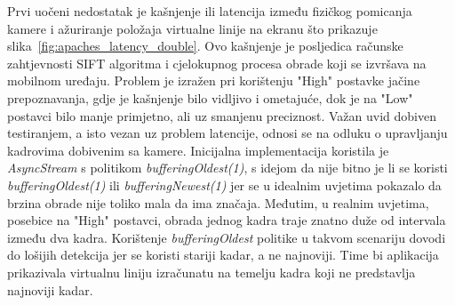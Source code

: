 Prvi uočeni nedostatak je kašnjenje ili latencija između fizičkog pomicanja kamere i ažuriranje položaja virtualne linije na ekranu što prikazuje slika~\ref{fig:apaches_latency_double}. Ovo kašnjenje je posljedica računske zahtjevnosti SIFT algoritma i cjelokupnog procesa obrade koji se izvršava na mobilnom uređaju. Problem je izražen pri korištenju "High" postavke jačine prepoznavanja, gdje je kašnjenje bilo vidljivo i ometajuće, dok je na "Low" postavci bilo manje primjetno, ali uz smanjenu preciznost. 
Važan uvid dobiven testiranjem, a isto vezan uz problem latencije, odnosi se na odluku o upravljanju kadrovima dobivenim sa kamere. Inicijalna implementacija koristila je \textit{AsyncStream} s politikom \textit{bufferingOldest(1)}, s idejom da nije bitno je li se koristi \textit{bufferingOldest(1)} ili \textit{bufferingNewest(1)} jer se u idealnim uvjetima pokazalo da brzina obrade nije toliko mala da ima značaja. Međutim, u realnim uvjetima, posebice na "High" postavci, obrada jednog kadra traje znatno duže od intervala između dva kadra. Korištenje \textit{bufferingOldest} politike u takvom scenariju dovodi do lošijih detekcija jer se koristi stariji kadar, a ne najnoviji. Time bi aplikacija prikazivala virtualnu liniju izračunatu na temelju kadra koji ne predstavlja najnoviji kadar.

